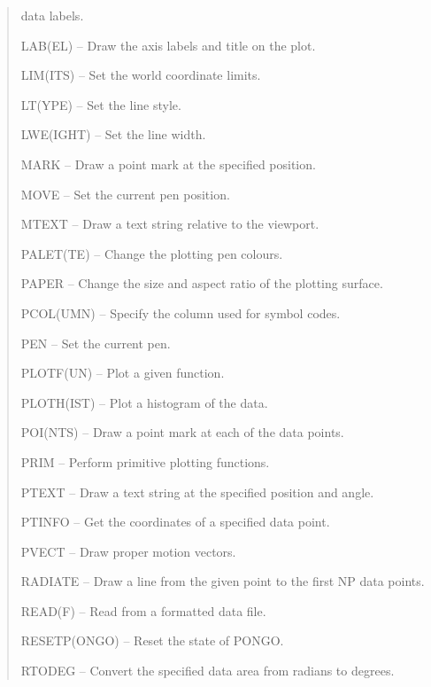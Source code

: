 \documentclass[twoside,11pt]{article}
\newcommand{\htmlref}[2]{#1}
\renewcommand{\_}{\texttt{\symbol{95}}}
\newcommand{\iref} [1]{\htmlref{#1}{#1}}
\newcommand{\iiref}[2]{\htmlref{#1}{#2}}
\begin{document}
\begin {quote}
\begin {description}
                                          data labels.
\item [\iiref{LAB(EL)}{LABEL}] -- Draw the axis labels and title on
                                  the plot.
\item [\iiref{LIM(ITS)}{LIMITS}] -- Set the world coordinate limits.
\item [\iiref{LT(YPE)}{LTYPE}] -- Set the line style.
\item [\iiref{LWE(IGHT)}{LWEIGHT}] -- Set the line width.
\item [\iref{MARK}] -- Draw a point mark at the specified position.
\item [\iref{MOVE}] -- Set the current pen position.
\item [\iref{MTEXT}] -- Draw a text string relative to the viewport.
\item [\iiref{PALET(TE)}{PALETTE}] -- Change the plotting pen colours.
\item [\iref{PAPER}] -- Change the size and aspect ratio of the plotting
                        surface.
\item [\iiref{PCOL(UMN)}{PCOLUMN}] -- Specify the column used for symbol
                                      codes.
\item [\iref{PEN}] -- Set the current pen.
\item [\iiref{PLOTF(UN)}{PLOTFUN}] -- Plot a given function.
\item [\iiref{PLOTH(IST)}{PLOTHIST}] -- Plot a histogram of the data.
\item [\iiref{POI(NTS)}{POINTS}] -- Draw a point mark at each of the
                                    data points.
\item [\iref{PRIM}] -- Perform primitive plotting functions.
\item [\iref{PTEXT}] -- Draw a text string at the specified position and angle.
\item [\iref{PTINFO}] -- Get the coordinates of a specified data point.
\item [\iref{PVECT}] -- Draw proper motion vectors.
\item [\iref{RADIATE}] -- Draw a line from the given point to the first NP data
                          points.
\item [\iiref{READ(F)}{READF}] -- Read from a formatted data file.
\item [\iiref{RESETP(ONGO)}{RESETPONGO}] -- Reset the state of PONGO.
\item [\iref{RTODEG}] -- Convert the specified data area from radians to
                         degrees.

\end{description}
\end{quote}
\end{document}
